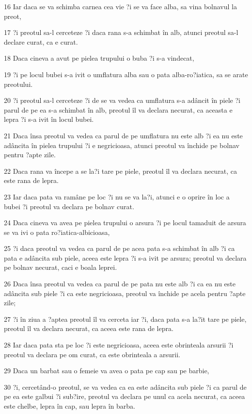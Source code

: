 \par 16 Iar daca se va schimba carnea cea vie ?i se va face alba, sa vina bolnavul la preot,
\par 17 ?i preotul sa-l cerceteze ?i daca rana s-a schimbat în alb, atunci preotul sa-l declare curat, ca e curat.
\par 18 Daca cineva a avut pe pielea trupului o buba ?i s-a vindecat,
\par 19 ?i pe locul bubei s-a ivit o umflatura alba sau o pata alba-ro?iatica, sa se arate preotului.
\par 20 ?i preotul sa-l cerceteze ?i de se va vedea ca umflatura s-a adâncit în piele ?i parul de pe ea s-a schimbat în alb, preotul îl va declara necurat, ca aceasta e lepra ?i s-a ivit în locul bubei.
\par 21 Daca însa preotul va vedea ca parul de pe umflatura nu este alb ?i ea nu este adâncita în pielea trupului ?i e negricioasa, atunci preotul va închide pe bolnav pentru ?apte zile.
\par 22 Daca rana va începe a se la?i tare pe piele, preotul îl va declara necurat, ca este rana de lepra.
\par 23 Iar daca pata va ramâne pe loc ?i nu se va la?i, atunci e o oprire în loc a bubei ?i preotul va declara pe bolnav curat.
\par 24 Daca cineva va avea pe pielea trupului o arsura ?i pe locul tamaduit de arsura se va ivi o pata ro?iatica-albicioasa,
\par 25 ?i daca preotul va vedea ca parul de pe acea pata s-a schimbat în alb ?i ca pata e adâncita sub piele, aceea este lepra ?i s-a ivit pe arsura; preotul va declara pe bolnav necurat, caci e boala leprei.
\par 26 Daca însa preotul va vedea ca parul de pe pata nu este alb ?i ca ea nu este adâncita sub piele ?i ca este negricioasa, preotul va închide pe acela pentru ?apte zile;
\par 27 ?i în ziua a ?aptea preotul îl va cerceta iar ?i, daca pata s-a la?it tare pe piele, preotul îl va declara necurat, ca aceea este rana de lepra.
\par 28 Iar daca pata sta pe loc ?i este negricioasa, aceea este obrinteala arsurii ?i preotul va declara pe om curat, ca este obrinteala a arsurii.
\par 29 Daca un barbat sau o femeie va avea o pata pe cap sau pe barbie,
\par 30 ?i, cercetând-o preotul, se va vedea ca ea este adâncita sub piele ?i ca parul de pe ea este galbui ?i sub?ire, preotul va declara pe unul ca acela necurat, ca aceea este chelbe, lepra în cap, sau lepra în barba.
